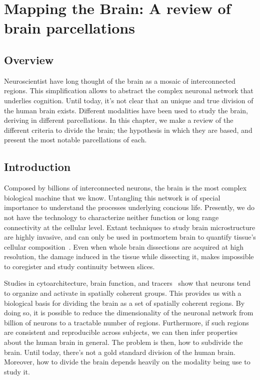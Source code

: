 \chapter{Mapping the Brain: A review of brain parcellations}

\section{Overview}
Neuroscientist have long thought of the brain as a mosaic of interconnected
regions. This simplification allows to abstract the complex neuronal network
that underlies cognition. Until today, it's not clear that an unique and true
division of the human brain exists. Different modalities have been used to
study the brain, deriving in different parcellations. In this chapter, we make
a review of the different criteria to divide the brain; the hypothesis in
which they are based, and present the most notable parcellations of each.


\section{Introduction}
Composed by billions of interconnected neurons, the brain is the most complex
biological machine that we know. Untangling this network is of special importance
to understand the processes underlying concious life. Presently, we do not have
the technology to characterize neither function or long range connectivity at
the cellular level. Extant techniques to study brain microstructure
are highly invasive, and can only be used in postmortem brain to quantify
tissue's cellular composition~\cite{Swanson1982, Schmahmann2006, Amunts2007, Ding2016}.
Even when whole brain dissections are acquired at high resolution\cite{Mohlberg2012, Amunts2013, Ding2016},
the damage induced in the tissue while dissecting it, makes impossible to coregister
and study continuity between slices. 

Studies in cytoarchitecture\cite{Meynert1872, Brodmann1909, VonEconomo1925}, brain
function\cite{Penfield1954, VonderMalsburg1994}, and tracers~\cite{Schmahmann2006, Stephan2013}
show that neurons tend to organize and activate in spatially coherent groups.
This provides us with a biological basis for dividing the brain as a set of spatially
coherent regions. By doing so, it is possible to reduce the dimensionality of the
neuronal network from billion of neurons to a tractable number of regions.
Furthermore, if such regions are consistent and reproducible across subjects,
we can then infer properties about the human brain in general. The problem is then,
how to subdivide the brain. Until today, there's not a gold standard division of the
human brain. Moreover, how to divide the brain depends heavily on the modality
being use to study it.


